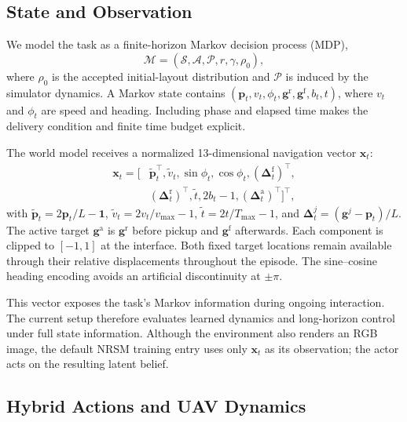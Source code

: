 \documentclass{article}
\begin{document}
\subsection{State and Observation}

We model the task as a finite-horizon Markov decision process (MDP),
\begin{equation}
\mathcal M=(\mathcal S,\mathcal A,\mathcal P,r,\gamma,\rho_0),
\label{eq:uav_mdp_tuple}
\end{equation}
where $\rho_0$ is the accepted initial-layout distribution and $\mathcal P$ is induced by the simulator dynamics. A Markov state contains $(\mathbf p_t,v_t,\phi_t,\mathbf g^{\mathrm r},\mathbf g^{\mathrm f},b_t,t)$, where $v_t$ and $\phi_t$ are speed and heading. Including phase and elapsed time makes the delivery condition and finite time budget explicit.

The world model receives a normalized 13-dimensional navigation vector $\mathbf x_t$:
\begin{equation}
\begin{aligned}
\mathbf x_t=\big[&\widetilde{\mathbf p}_t^{\top},\widetilde v_t,
\sin\phi_t,\cos\phi_t,
(\boldsymbol\Delta_t^{\mathrm f})^{\top},\\
&(\boldsymbol\Delta_t^{\mathrm r})^{\top},\widetilde t,
2b_t-1,(\boldsymbol\Delta_t^{\mathrm a})^{\top}\big]^{\top},
\end{aligned}
\label{eq:uav_state}
\end{equation}
with $\widetilde{\mathbf p}_t=2\mathbf p_t/L-\mathbf 1$, $\widetilde v_t=2v_t/v_{\max}-1$, $\widetilde t=2t/T_{\max}-1$, and $\boldsymbol\Delta_t^j=(\mathbf g^j-\mathbf p_t)/L$. The active target $\mathbf g^{\mathrm a}$ is $\mathbf g^{\mathrm r}$ before pickup and $\mathbf g^{\mathrm f}$ afterwards. Each component is clipped to $[-1,1]$ at the interface. Both fixed target locations remain available through their relative displacements throughout the episode. The sine--cosine heading encoding avoids an artificial discontinuity at $\pm\pi$.

This vector exposes the task's Markov information during ongoing interaction. The current setup therefore evaluates learned dynamics and long-horizon control under full state information. Although the environment also renders an RGB image, the default NRSM training entry uses only $\mathbf x_t$ as its observation; the actor acts on the resulting latent belief.

\subsection{Hybrid Actions and UAV Dynamics}
\end{document}
